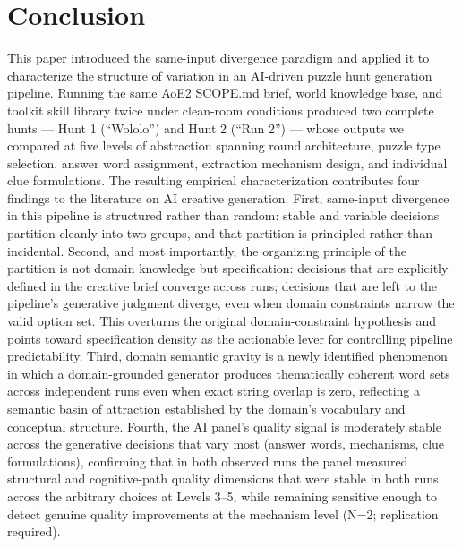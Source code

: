 \section{Conclusion}

This paper introduced the same-input divergence paradigm and applied it to characterize the structure of variation in an AI-driven puzzle hunt generation pipeline. Running the same AoE2 SCOPE.md brief, world knowledge base, and toolkit skill library twice under clean-room conditions produced two complete hunts --- Hunt 1 (``Wololo'') and Hunt 2 (``Run 2'') --- whose outputs we compared at five levels of abstraction spanning round architecture, puzzle type selection, answer word assignment, extraction mechanism design, and individual clue formulations. The resulting empirical characterization contributes four findings to the literature on AI creative generation. First, same-input divergence in this pipeline is structured rather than random: stable and variable decisions partition cleanly into two groups, and that partition is principled rather than incidental. Second, and most importantly, the organizing principle of the partition is not domain knowledge but specification: decisions that are explicitly defined in the creative brief converge across runs; decisions that are left to the pipeline's generative judgment diverge, even when domain constraints narrow the valid option set. This overturns the original domain-constraint hypothesis and points toward specification density as the actionable lever for controlling pipeline predictability. Third, domain semantic gravity is a newly identified phenomenon in which a domain-grounded generator produces thematically coherent word sets across independent runs even when exact string overlap is zero, reflecting a semantic basin of attraction established by the domain's vocabulary and conceptual structure. Fourth, the AI panel's quality signal is moderately stable across the generative decisions that vary most (answer words, mechanisms, clue formulations), confirming that in both observed runs the panel measured structural and cognitive-path quality dimensions that were stable in both runs across the arbitrary choices at Levels 3--5, while remaining sensitive enough to detect genuine quality improvements at the mechanism level (N=2; replication required).

